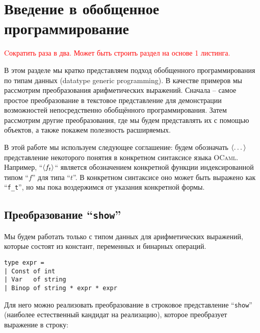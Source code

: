 \section{Введение в обобщенное программирование }
\label{sec:tutorial}

\textcolor{red}{Cократить раза в два. Может быть строить раздел на основе 1 листинга.}

В этом разделе мы кратко представляем  подход обобщенного программирования по типам данных (datatype generic programming). В качестве примеров мы рассмотрим преобразования арифметических выражений.  Сначала -- самое простое преобразование в текстовое представление для демонстрации возможностей непосредственно обобщённого программирования. Затем рассмотрим другие преобразования, где мы будем представлять их с помощью объектов, а также покажем полезность расширяемых.



В этой работе мы используем следующее соглашение: будем обозначать $\left<\dots\right>$ представление некоторого понятия в конкретном синтаксисе языка \textsc{OCaml}. Например, ``$\left<f_t\right>$`` является обозначением конкретной функции индексированной типом  ``$f$'' для типа ``$t$''. 
В конкретном синтаксисе оно может быть выражено как ``\lstinline{f_t}'', но мы пока воздержимся от указания конкретной формы.


\subsection{Преобразование ``\texttt{show}''}

Мы будем работать только с типом данных для арифметических выражений, которые состоят из констант, переменных и бинарных операций.

\begin{lstlisting}
type expr =
| Const of int
| Var   of string
| Binop of string * expr * expr
\end{lstlisting}


Для него можно реализовать преобразование в строковое представление ``\lstinline{show}''
(наиболее естественный кандидат на реализацию),
которое преобразует выражение в строку: 

